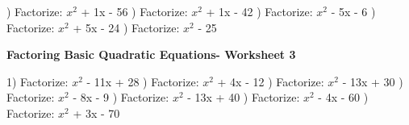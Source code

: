\documentclass{article}%
\begin{document}
\newline%
\newline%
) Factorize: $x^2$ + 1x - 56%
\newline%
\newline%
) Factorize: $x^2$ + 1x - 42%
\newline%
\newline%
) Factorize: $x^2$ - 5x - 6%
\newline%
\newline%
) Factorize: $x^2$ + 5x - 24%
\newline%
\newline%
) Factorize: $x^2$ - 25%
\newline%
\newline%
\newline%
\pagebreak%
\large%
\begin{center}%
\textbf{Factoring Basic Quadratic Equations- Worksheet 3}%
\newline%
\newline%
\newline%
\end{center} \normalsize%
1) Factorize: $x^2$ - 11x + 28%
\newline%
\newline%
) Factorize: $x^2$ + 4x - 12%
\newline%
\newline%
) Factorize: $x^2$ - 13x + 30%
\newline%
\newline%
) Factorize: $x^2$ - 8x - 9%
\newline%
\newline%
) Factorize: $x^2$ - 13x + 40%
\newline%
\newline%
) Factorize: $x^2$ - 4x - 60%
\newline%
\newline%
) Factorize: $x^2$ + 3x - 70%
\newline%
\newline%
\end{document}
